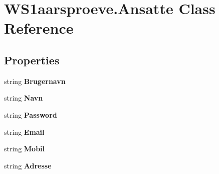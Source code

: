 \hypertarget{class_w_s1aarsproeve_1_1_ansatte}{}\section{W\+S1aarsproeve.\+Ansatte Class Reference}
\label{class_w_s1aarsproeve_1_1_ansatte}
\subsection*{Properties}
\begin{DoxyCompactItemize}
\item 
\hypertarget{class_w_s1aarsproeve_1_1_ansatte_af4eea3ca86ceb554b5379e819e5e1564}{}string {\bfseries Brugernavn}\label{class_w_s1aarsproeve_1_1_ansatte_af4eea3ca86ceb554b5379e819e5e1564}

\item 
\hypertarget{class_w_s1aarsproeve_1_1_ansatte_a46767e24a97cd4f5048b2929a9dee858}{}string {\bfseries Navn}\label{class_w_s1aarsproeve_1_1_ansatte_a46767e24a97cd4f5048b2929a9dee858}

\item 
\hypertarget{class_w_s1aarsproeve_1_1_ansatte_a993ef3da1ee00cee437aac73da154362}{}string {\bfseries Password}\label{class_w_s1aarsproeve_1_1_ansatte_a993ef3da1ee00cee437aac73da154362}

\item 
\hypertarget{class_w_s1aarsproeve_1_1_ansatte_ac33e040e05f6bf10fef16985ab886d67}{}string {\bfseries Email}\label{class_w_s1aarsproeve_1_1_ansatte_ac33e040e05f6bf10fef16985ab886d67}

\item 
\hypertarget{class_w_s1aarsproeve_1_1_ansatte_ad646658e4bbcf23653b6199dadbff943}{}string {\bfseries Mobil}\label{class_w_s1aarsproeve_1_1_ansatte_ad646658e4bbcf23653b6199dadbff943}

\item 
\hypertarget{class_w_s1aarsproeve_1_1_ansatte_a9fecfb7308fc5bee164415316f66d5e7}{}string {\bfseries Adresse}\label{class_w_s1aarsproeve_1_1_ansatte_a9fecfb7308fc5bee164415316f66d5e7}


\end{DoxyCompactItemize}

